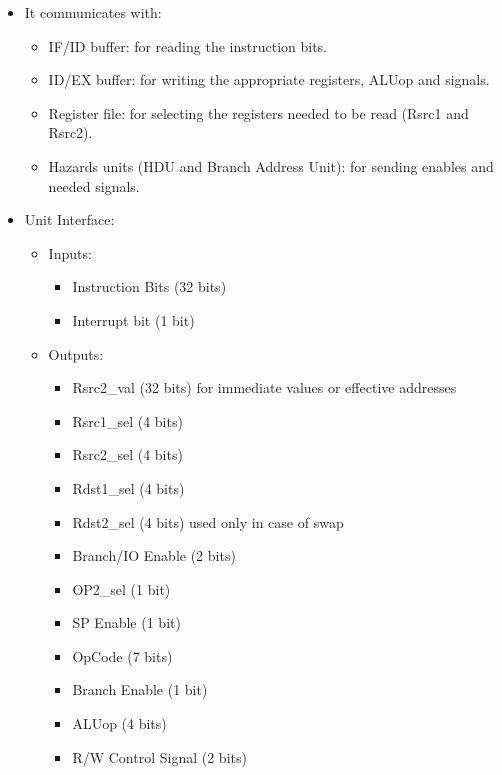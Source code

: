 \documentclass[12pt]{report}
\begin{document}
\begin{itemize}
    \item It communicates with:
    \begin{itemize}
        \item IF/ID buffer: for reading the instruction bits.
        \item ID/EX buffer: for writing the appropriate registers, ALUop and signals.
        \item Register file: for selecting the registers needed to be read (Rsrc1 and Rsrc2).
        \item Hazards units (HDU and Branch Address Unit): for sending enables and needed signals.
    \end{itemize}
    
    \item Unit Interface:
    \begin{itemize}
    
        \item Inputs: 
        \begin{itemize}
            \item Instruction Bits (32 bits)
            \item Interrupt bit (1 bit)
        \end{itemize}
        
        \item Outputs:
        \begin{itemize}
            \item Rsrc2\_val (32 bits) for immediate values or effective addresses
            \item Rsrc1\_sel (4 bits)
            \item Rsrc2\_sel (4 bits)
            \item Rdst1\_sel (4 bits)
            \item Rdst2\_sel (4 bits) used only in case of swap
            \item Branch/IO Enable (2 bits)
            \item OP2\_sel (1 bit)
            \item SP Enable (1 bit)
            \item OpCode (7 bits)
            \item Branch Enable (1 bit)
            \item ALUop (4 bits)
            \item R/W Control Signal (2 bits)
        \end{itemize}
        

\end{itemize}
\end{itemize}
\end{document}
